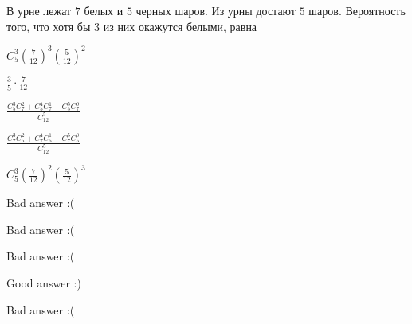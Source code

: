 
\begin{question}
В урне лежат \(7\) белых и \(5\) черных шаров. Из урны достают \(5\)
шаров. Вероятность того, что хотя бы \(3\) из них окажутся белыми, равна
\begin{answerlist}
  \item \(C_5^3 \left( \frac{7}{12} \right)^3 \left( \frac{5}{12} \right)^2\)
  \item \(\frac{3}{5} \cdot \frac{7}{12}\)
  \item \(\frac{C_5^3 C_7^2 + C_5^4 C_7^1 + C_5^5 C_7^0}{C_{12}^5}\)
  \item \(\frac{C_7^3 C_5^2+C_7^4 C_5^1+C_7^5 C_5^0}{C_{12}^5}\)
  \item \(C_5^3\left( \frac{7}{12} \right)^2\left( \frac{5}{12} \right)^3\)
\end{answerlist}
\end{question}

\begin{solution}
\begin{answerlist}
  \item Bad answer :(
  \item Bad answer :(
  \item Bad answer :(
  \item Good answer :)
  \item Bad answer :(
\end{answerlist}
\end{solution}

